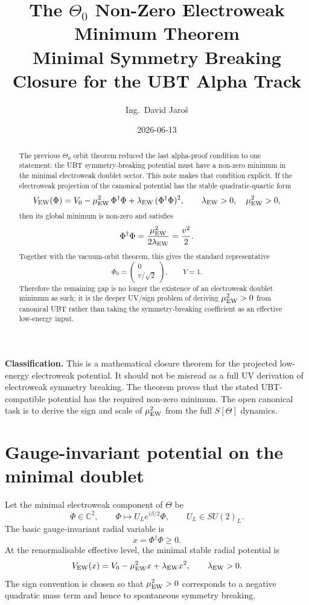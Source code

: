 \documentclass[12pt,a4paper]{article}
\title{The $\Theta_0$ Non-Zero Electroweak Minimum Theorem\\
       \large Minimal Symmetry Breaking Closure for the UBT Alpha Track}
\author{Ing.\ David Jaro\v{s}}
\date{2026-06-13}
\begin{document}
\maketitle
\fi

\begin{abstract}
The previous $\Theta_0$ orbit theorem reduced the last alpha-proof condition to
one statement: the UBT symmetry-breaking potential must have a non-zero minimum
in the minimal electroweak doublet sector.  This note makes that condition
explicit.  If the electroweak projection of the canonical potential has the
stable quadratic-quartic form
\[
  V_{\rm EW}(\Phi)
  =
  V_0-
  \mu_{\rm EW}^2\,\Phi^\dagger\Phi
  +
  \lambda_{\rm EW}\,(\Phi^\dagger\Phi)^2,
  \qquad
  \lambda_{\rm EW}>0,
  \quad
  \mu_{\rm EW}^2>0,
\]
then its global minimum is non-zero and satisfies
\[
  \Phi^\dagger\Phi=\frac{\mu_{\rm EW}^2}{2\lambda_{\rm EW}}
  =\frac{v^2}{2}.
\]
Together with the vacuum-orbit theorem, this gives the standard representative
\[
  \Phi_0=\begin{pmatrix}0\\v/\sqrt2\end{pmatrix},
  \qquad Y=1.
\]
Therefore the remaining gap is no longer the existence of an electroweak doublet
minimum as such; it is the deeper UV/sign problem of deriving
$\mu_{\rm EW}^2>0$ from canonical UBT rather than taking the symmetry-breaking
coefficient as an effective low-energy input.
\end{abstract}

\begin{statusbox}
\textbf{Classification.} This is a mathematical closure theorem for the
projected low-energy electroweak potential.  It should not be misread as a full
UV derivation of electroweak symmetry breaking.  The theorem proves that the
stated UBT-compatible potential has the required non-zero minimum.  The open
canonical task is to derive the sign and scale of $\mu_{\rm EW}^2$ from the full
$S[\Theta]$ dynamics.
\end{statusbox}

\section{Gauge-invariant potential on the minimal doublet}

Let the minimal electroweak component of $\Theta$ be
\[
  \Phi\in\mathbb C^2,
  \qquad
  \Phi\mapsto U_L e^{i\beta/2}\Phi,
  \qquad
  U_L\in SU(2)_L.
\]
The basic gauge-invariant radial variable is
\[
  x=\Phi^\dagger\Phi\ge 0.
\]
At the renormalisable effective level, the minimal stable radial potential is
\[
  V_{\rm EW}(x)=V_0-\mu_{\rm EW}^2 x+\lambda_{\rm EW}x^2,
  \qquad
  \lambda_{\rm EW}>0.
\]
The sign convention is chosen so that $\mu_{\rm EW}^2>0$ corresponds to a
negative quadratic mass term and hence to spontaneous symmetry breaking.
\end{document}
